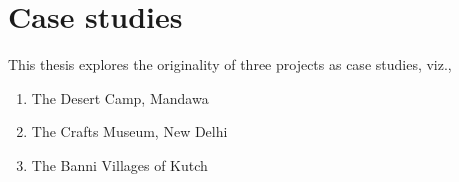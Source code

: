 \chapter{Case studies} %
\label{cha:case_studies}

This thesis explores the originality of three projects as case studies, viz.,

\begin{enumerate}
  \item The Desert Camp, Mandawa
  \item The Crafts Museum, New Delhi
  \item The Banni Villages of Kutch
\end{enumerate}





